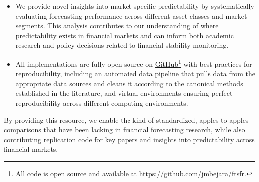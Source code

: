 \documentclass{article}
\begin{document}
\begin{itemize}
    \item We provide novel insights into market-specific predictability by systematically evaluating forecasting performance across different asset classes and market segments. This analysis contributes to our understanding of where predictability exists in financial markets and can inform both academic research and policy decisions related to financial stability monitoring.
    
    \item All implementations are fully open source on \href{https://github.com/jmbejara/ftsfr}{GitHub}\footnote{All code is open source and available at \url{https://github.com/jmbejara/ftsfr}.} with best practices for reproducibility, including an automated data pipeline that pulls data from the appropriate data sources and cleans it according to the canonical methods established in the literature, and virtual environments ensuring perfect reproducibility across different computing environments.
\end{itemize}

By providing this resource, we enable the kind of standardized, apples-to-apples comparisons that have been lacking in financial forecasting research, while also contributing replication code for key papers and insights into predictability across financial markets.
\end{document}
